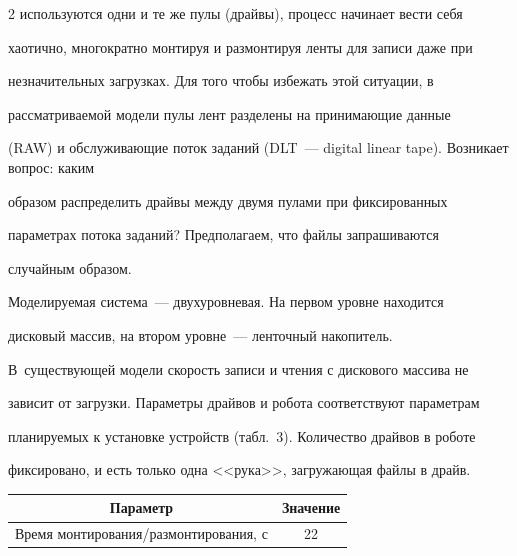\begin{multicols}{2}
используются одни и те же пулы (драйвы), процесс начинает вести себя 


хаотично, многократно монтируя и размонтируя ленты для записи даже при 


незначительных загрузках. Для того чтобы избежать этой ситуации, в 


рассматриваемой модели пулы лент разделены на принимающие данные 


(RAW) и обслуживающие поток заданий (DLT~--- digital linear tape). Возникает вопрос: каким 


образом распределить драйвы между двумя пулами при фиксированных 


параметрах потока заданий? Предполагаем, что файлы запрашиваются 


случайным образом. 


   


   Моделируемая система~--- двухуровневая. На первом уровне находится 


дисковый массив, на втором уровне~--- ленточный накопитель. 


В~существующей модели скорость записи и чтения с дискового массива не 


зависит от загрузки. Параметры драйвов и робота соответствуют параметрам 


планируемых к установке устройств (табл.~3). Количество драйвов в роботе 


фиксировано, и есть только одна <<рука>>, загружающая файлы в драйв.


   


   \begin{table}\small %


   \begin{center}




   \vspace*{2ex}


   


   \tabcolsep=10pt


   \begin{tabular}{|l|c|}


   \hline


\multicolumn{1}{|c|}{Параметр}&Значение\\


\hline


Время монтирования/размонтирования, с&\hphantom{99}22\\



\end{tabular}
\end{center}
\end{table}
\end{multicols}
